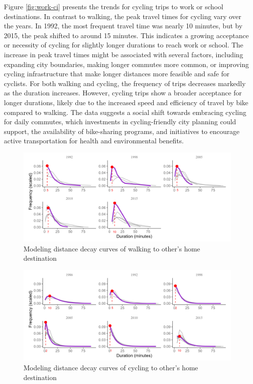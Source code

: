 \documentclass[
11pt, %
oneside, %
english, %
singlespacing, %
]{macthesis} %
\begin{document}
Figure \ref{fig:work-ci} presents the trends for cycling trips to work or school destinations. In contrast to walking, the peak travel times for cycling vary over the years. In 1992, the most frequent travel time was nearly 10 minutes, but by 2015, the peak shifted to around 15 minutes. This indicates a growing acceptance or necessity of cycling for slightly longer durations to reach work or school. The increase in peak travel times might be associated with several factors, including expanding city boundaries, making longer commutes more common, or improving cycling infrastructure that make longer distances more feasible and safe for cyclists. For both walking and cycling, the frequency of trips decreases markedly as the duration increases. However, cycling trips show a broader acceptance for longer durations, likely due to the increased speed and efficiency of travel by bike compared to walking. The data suggests a social shift towards embracing cycling for daily commutes, which investments in cycling-friendly city planning could support, the availability of bike-sharing programs, and initiatives to encourage active transportation for health and environmental benefits.

\begin{landscape}
\begin{figure}

{\centering \includegraphics[width=0.9\linewidth]{figure/ch03-Fig07} 

}

\caption{Modeling distance decay curves of walking to other's home destination}\label{fig:other-wi}
\end{figure}


\begin{figure}

{\centering \includegraphics[width=0.9\linewidth]{figure/ch03-Fig08} 

}

\caption{Modeling distance decay curves of cycling to other's home destination}\label{fig:other-ci}
\end{figure}
\end{landscape}
\end{document}
